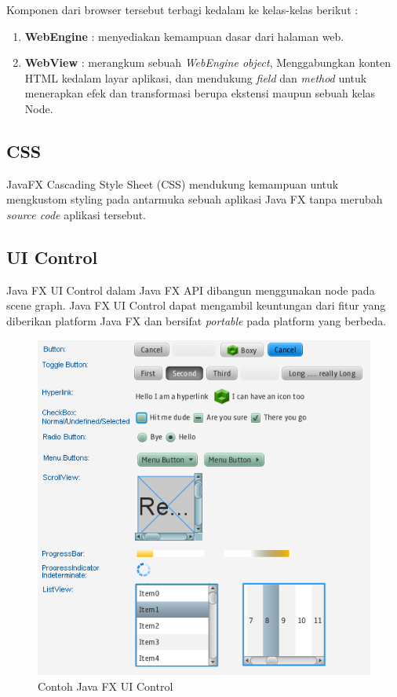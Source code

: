 Komponen dari browser tersebut terbagi kedalam ke kelas-kelas berikut :\cite{javafx}
\begin{enumerate}
	\item \textbf{WebEngine} : menyediakan kemampuan dasar dari halaman web.
	\item \textbf{WebView} : merangkum sebuah \textit{WebEngine object}, Menggabungkan konten HTML kedalam layar aplikasi, dan mendukung \textit{field} dan \textit{method} untuk menerapkan efek dan transformasi berupa ekstensi maupun sebuah kelas Node.
\end{enumerate}

\subsection{CSS}
\label{subs:CSS}
JavaFX Cascading Style Sheet (CSS) mendukung kemampuan untuk mengkustom styling pada antarmuka sebuah aplikasi Java FX tanpa merubah \textit{source code} aplikasi tersebut.\cite{javafx}   

\subsection{UI Control}
\label{subs:UI_Control}
Java FX UI Control dalam Java FX API dibangun menggunakan node pada scene graph. Java FX UI Control dapat mengambil keuntungan dari fitur yang diberikan platform Java FX dan bersifat \textit{portable} pada platform yang berbeda.\cite{javafx}

\begin{figure}[H]
	\centering
	\includegraphics[scale=0.8]{Gambar/JavaFXuicontrols}
	\caption{Contoh Java FX UI Control}
	\end{figure}
	
